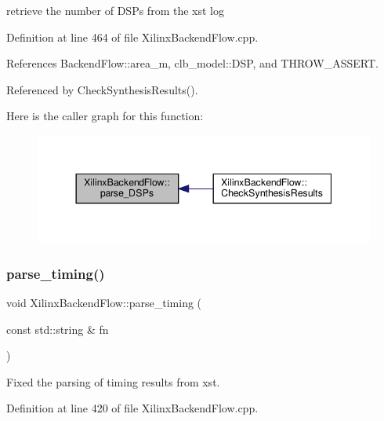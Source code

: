 retrieve the number of D\+S\+Ps from the xst log 



Definition at line 464 of file Xilinx\+Backend\+Flow.\+cpp.



References Backend\+Flow\+::area\+\_\+m, clb\+\_\+model\+::\+D\+SP, and T\+H\+R\+O\+W\+\_\+\+A\+S\+S\+E\+RT.



Referenced by Check\+Synthesis\+Results().

Here is the caller graph for this function\+:
\nopagebreak
\begin{figure}[H]
\begin{center}
\leavevmode
\includegraphics[width=344pt]{d6/d94/classXilinxBackendFlow_aad2aac0a9f9a4158831cfd4f842a8b24_icgraph}
\end{center}
\end{figure}
\mbox{\label{classXilinxBackendFlow_a7316d2350ad8ab06e640e91d7b7baad3}} 
\subsubsection{\texorpdfstring{parse\+\_\+timing()}{parse\_timing()}}
{\footnotesize\ttfamily void Xilinx\+Backend\+Flow\+::parse\+\_\+timing (\begin{DoxyParamCaption}\item[{const std\+::string \&}]{fn }\end{DoxyParamCaption})\hspace{0.3cm}{\ttfamily [protected]}}



Fixed the parsing of timing results from xst. 



Definition at line 420 of file Xilinx\+Backend\+Flow.\+cpp.



